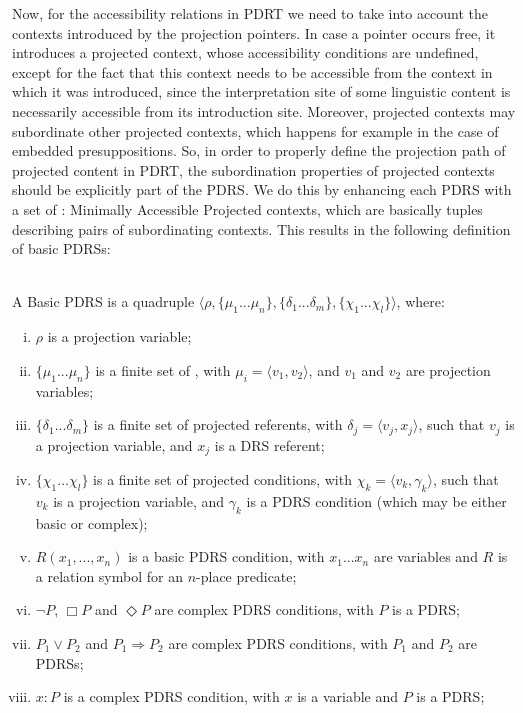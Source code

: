 Now, for the accessibility relations in PDRT we need to take into
account the contexts introduced by the projection pointers.  In case
a pointer occurs free, it introduces a projected context, whose
accessibility conditions are undefined, except for the fact that this
context needs to be accessible from the context in which it was introduced,
since the interpretation site of some linguistic content is necessarily
accessible from its introduction site. Moreover, projected contexts may
subordinate other projected contexts, which happens for example in the case
of embedded presuppositions. So, in order to properly define the projection
path of projected content in PDRT, the subordination properties of projected
contexts should be explicitly part of the PDRS. We do this by enhancing each
PDRS with a set of \MAPs: Minimally Accessible Projected contexts, which are
basically tuples describing pairs of  subordinating contexts. This results
in the following definition of basic PDRSs:

\begin{definition} \label{def:bPDRS}~\\
A Basic PDRS is a quadruple $\langle \rho, \{\mu_1 ... \mu_n\}, 
\{\delta_1 ... \delta_m\}, \{\chi_1 ... \chi_l\}\rangle$, where:
  \begin{enumerate}[i.]
    \item $\rho$ is a projection variable;
    \item $\{\mu_1 ... \mu_n\}$ is a finite set of \MAPs, with $\mu_i=\langle
      v_1,v_2\rangle$, and  $v_1$ and $v_2$ are projection variables;
    \item $\{\delta_1 ... \delta_m\}$ is a finite set of projected
      referents, with $\delta_j=\langle v_j, x_j\rangle$, such that $v_j$ is
      a projection variable, and $x_j$ is a DRS referent;
    \item $\{\chi_1 ... \chi_l\}$ is a finite set of projected conditions,
      with $\chi_k = \langle v_k,\gamma_k\rangle$, such that $v_k$ is a
      projection variable, and $\gamma_k$ is a PDRS condition (which may be
      either basic or complex);
    \item \label{def:bPDRS:Rel} $R(x_1, ..., x_n)$ is a basic PDRS condition,
      with $x_1 ... x_n$ are variables and $R$ is a relation symbol for an
      $n$-place predicate;
    \item $\neg P$, $\Box P$ and $\Diamond P$ are complex PDRS conditions,
      with $P$ is a PDRS;
    \item $P_1 \vee P_2$ and $P_1 \Rightarrow P_2$ are complex PDRS
      conditions, with $P_1$ and $P_2$ are PDRSs;
    \item\label{def:bPDRS:Prop} $x:P$ is a complex PDRS condition, with $x$
      is a variable and $P$ is a PDRS;
  \end{enumerate}
\end{definition}

